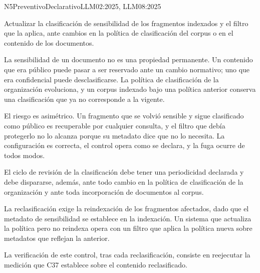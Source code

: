 
  {N5}{Preventivo}{Declarativo}{LLM02:2025, LLM08:2025}

Actualizar la clasificación de sensibilidad de los fragmentos indexados y el filtro que la aplica, ante cambios en la política de clasificación del corpus o en el contenido de los documentos.

La sensibilidad de un documento no es una propiedad permanente. Un contenido que era público puede pasar a ser reservado ante un cambio normativo; uno que era confidencial puede desclasificarse. La política de clasificación de la organización evoluciona, y un corpus indexado bajo una política anterior conserva una clasificación que ya no corresponde a la vigente.

El riesgo es asimétrico. Un fragmento que se volvió sensible y sigue clasificado como público es recuperable por cualquier consulta, y el filtro que debía protegerlo no lo alcanza porque su metadato dice que no lo necesita. La configuración es correcta, el control opera como se declara, y la fuga ocurre de todos modos.

El ciclo de revisión de la clasificación debe tener una periodicidad declarada y debe dispararse, además, ante todo cambio en la política de clasificación de la organización y ante toda incorporación de documentos al corpus.

La reclasificación exige la reindexación de los fragmentos afectados, dado que el metadato de sensibilidad se establece en la indexación. Un sistema que actualiza la política pero no reindexa opera con un filtro que aplica la política nueva sobre metadatos que reflejan la anterior.

La verificación de este control, tras cada reclasificación, consiste en reejecutar la medición que C37 establece sobre el contenido reclasificado.



